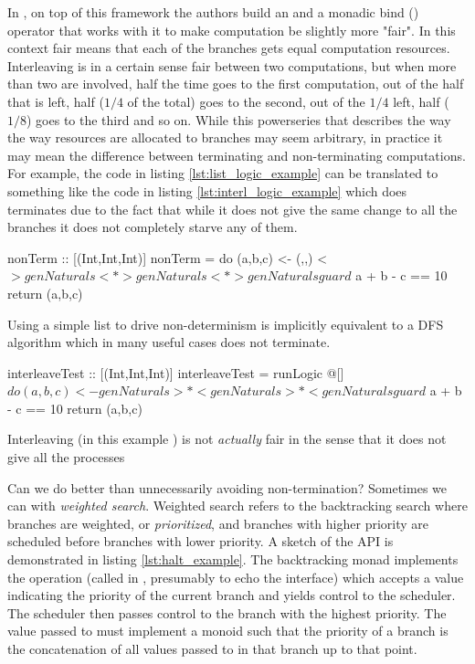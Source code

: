 In \cite{kiselyovBacktrackingInterleavingTerminating}, on top of this
framework the authors build an  and a monadic bind
(\hask{>>-}) operator that works with it to make computation be
slightly more "fair". In this context fair means that each of the
branches gets equal computation resources. Interleaving is in a
certain sense fair between two computations, but when more than two
are involved, half the time goes to the first computation, out of the
half that is left, half (\(1/4\) of the total) goes to the second, out
of the \(1/4\) left, half (\(1/8\)) goes to the third and so on. While
this powerseries that describes the way the way resources are
allocated to branches may seem arbitrary, in practice it may mean the
difference between terminating and non-terminating computations. For
example, the code in listing \ref{lst:list_logic_example} can be
translated to something like the code in listing
\ref{lst:interl_logic_example} which does terminates due to the fact
that while it does not give the same change to all the branches it
does not completely starve any of them.

\begin{code}
\begin{haskellcode}
nonTerm :: [(Int,Int,Int)]
nonTerm = do
  (a,b,c) <- (,,) <$> genNaturals <*> genNaturals <*> genNaturals
  guard $ a + b - c == 10
  return (a,b,c)
\end{haskellcode}
  \caption{\label{lst:list_logic_example}Using a simple list to drive
    non-determinism is implicitly equivalent to a DFS algorithm which
    in many useful cases does not terminate.}
\end{code}

\begin{code}
\begin{haskellcode}
interleaveTest :: [(Int,Int,Int)]
interleaveTest = runLogic @[] $ do
  (a,b,c) <- genNaturals >*< genNaturals >*< genNaturals
  guard $ a + b - c == 10
  return (a,b,c)
\end{haskellcode}
  \caption{\label{lst:interl_logic_example}Interleaving (in this
    example \hask{>*<}) is not \emph{actually} fair in the sense that
    it does not give all the processes}
\end{code}

Can we do better than unnecessarily avoiding non-termination?
Sometimes we can with \emph{weighted search}. Weighted search refers
to the backtracking search where branches are weighted, or
\emph{prioritized}, and branches with higher priority are scheduled
before branches with lower priority. A sketch of the API is
demonstrated in listing \ref{lst:halt_example}. The backtracking monad
implements the  operation (called  in
\cite{kidneyAlgebrasWeightedSearch2021}, presumably to echo the
 interface) which accepts a value indicating the
priority of the current branch and yields control to the
scheduler. The scheduler then passes control to the branch with the
highest priority. The value passed to  must implement a
monoid such that the priority of a branch is the concatenation of all
values passed to  in that branch up to that point.

